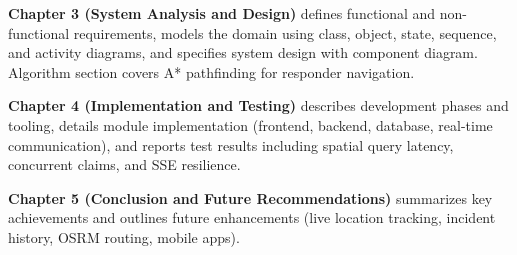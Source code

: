 \textbf{Chapter 3 (System Analysis and Design)} defines functional and non-functional requirements, models the domain using class, object, state, sequence, and activity diagrams, and specifies system design with component diagram. Algorithm section covers A* pathfinding for responder navigation.

\textbf{Chapter 4 (Implementation and Testing)} describes development phases and tooling, details module implementation (frontend, backend, database, real-time communication), and reports test results including spatial query latency, concurrent claims, and SSE resilience.

\textbf{Chapter 5 (Conclusion and Future Recommendations)} summarizes key achievements and outlines future enhancements (live location tracking, incident history, OSRM routing, mobile apps).
